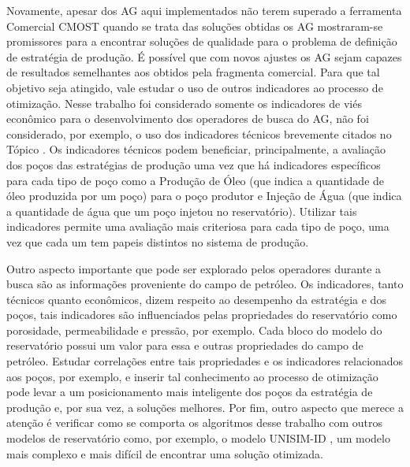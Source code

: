 Novamente, apesar dos AG aqui implementados não terem superado a ferramenta Comercial CMOST quando se trata das soluções obtidas os AG mostraram-se promissores para a encontrar soluções de qualidade para o problema de definição de estratégia de produção. É possível que com novos ajustes os AG sejam capazes de resultados semelhantes aos obtidos pela fragmenta comercial.  Para que tal objetivo seja atingido, vale estudar o uso de outros indicadores ao processo de otimização. Nesse trabalho foi considerado somente os indicadores de viés econômico para o desenvolvimento dos operadores de busca do AG, não foi considerado, por exemplo, o uso dos indicadores técnicos brevemente citados no Tópico . Os indicadores técnicos podem beneficiar, principalmente, a avaliação dos poços das estratégias de produção uma vez que há indicadores específicos para cada tipo de poço como a Produção de Óleo (que indica a quantidade de óleo produzida por um poço) para o poço produtor e Injeção de Água (que indica a quantidade de água que um poço injetou no reservatório). Utilizar tais indicadores permite uma avaliação mais criteriosa para cada tipo de poço, uma vez que cada um tem papeis distintos no sistema de produção. 

Outro aspecto importante que pode ser explorado pelos operadores durante a busca são as informações proveniente do campo de petróleo. Os indicadores, tanto técnicos quanto econômicos, dizem respeito ao desempenho da estratégia e dos poços, tais indicadores são influenciados pelas propriedades do reservatório como porosidade, permeabilidade e pressão, por exemplo. Cada bloco do modelo do reservatório possui um valor para essa e outras propriedades do campo de petróleo. Estudar correlações entre tais propriedades e os indicadores relacionados aos poços, por exemplo, e inserir tal conhecimento ao processo de otimização pode levar a um posicionamento mais inteligente dos poços da estratégia de produção e, por sua vez, a soluções melhores. Por fim, outro aspecto que merece a atenção é verificar como se comporta os algoritmos desse trabalho com outros modelos de reservatório como, por exemplo, o modelo UNISIM-ID \cite{GasparRavagnani2015}, um modelo mais complexo e mais difícil de encontrar uma solução otimizada.
